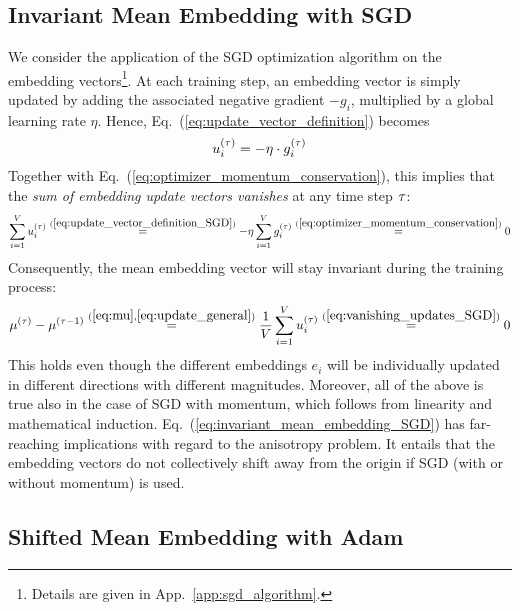 \subsection{Invariant Mean Embedding with SGD}

We consider the application of the SGD optimization algorithm on the embedding vectors\footnote{Details are given in App.~\ref{app:sgd_algorithm}.}.
At each training step, an embedding vector is simply updated by adding the associated negative gradient $-g_i$, multiplied by a global learning rate $\eta$. Hence, Eq.~(\ref{eq:update_vector_definition}) becomes
\begin{equation}
u_i^{(\tau)} = - \eta \cdot g_i^{(\tau)}
\label{eq:update_vector_definition_SGD}
\end{equation}
Together with Eq.~(\ref{eq:optimizer_momentum_conservation}), this implies that the {\em sum of embedding update vectors vanishes} at any time step $\tau$:
\begin{equation}
\sum_{i=1}^V  u_i^{(\tau)}
\stackrel{(\ref{eq:update_vector_definition_SGD})}{=} - \eta \sum_{i=1}^V g_i^{(\tau)} 
\stackrel{(\ref{eq:optimizer_momentum_conservation})}{=} 0
\label{eq:vanishing_updates_SGD}
\end{equation}
Consequently, the mean embedding vector will stay invariant during the training process:
\begin{equation}
    \mu^{(\tau)} - \mu^{(\tau-1)} 
    \stackrel{(\ref{eq:mu},\ref{eq:update_general})}{=} 
    \frac{1}{V} \sum_{i=1}^V u_i^{(\tau)} 
    \stackrel{(\ref{eq:vanishing_updates_SGD})}{=} 0
    \label{eq:invariant_mean_embedding_SGD}
\end{equation}
This holds even though the different embeddings $e_i$ will be individually updated in different directions with different magnitudes. 
Moreover, all of the above is true also in the case of SGD with momentum,
which follows from linearity and mathematical induction.
Eq.~(\ref{eq:invariant_mean_embedding_SGD}) has far-reaching implications with regard to the anisotropy problem. It entails that the embedding vectors do not collectively shift away from the origin if SGD (with or without momentum) is used. 

\subsection{Shifted Mean Embedding with Adam}

